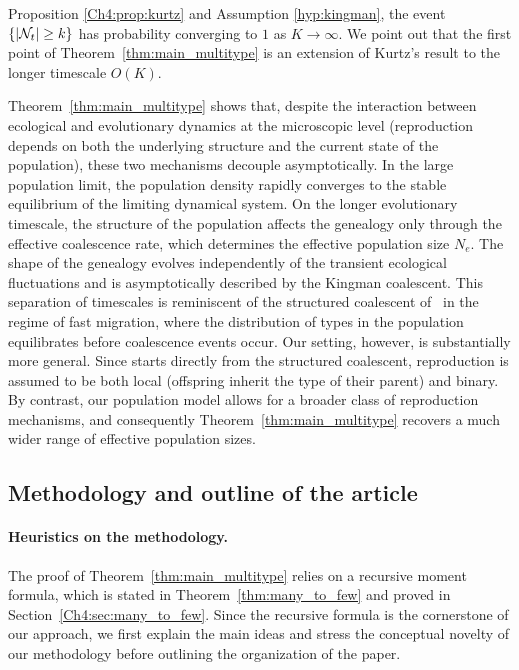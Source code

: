 \begin{refsegment}
\begin{rem}
Proposition \ref{Ch4:prop:kurtz} and Assumption \ref{hyp:kingman}, the event $\{|{\cal N}_t|\geq k\}$ has probability converging to $1$ as $K\to\infty$. 
We point out that the first point of Theorem~\ref{thm:main_multitype}
is an extension of Kurtz's result to the longer timescale $O(K)$.
\end{rem}

Theorem~\ref{thm:main_multitype} shows that, despite the interaction between ecological and evolutionary dynamics at the microscopic level (reproduction depends on both the underlying structure and the current state of the population), these two mechanisms decouple asymptotically. In the large population limit, the population density rapidly converges to the stable equilibrium of the limiting dynamical system. On the longer evolutionary timescale, the structure of the population affects the genealogy only through the effective coalescence rate, which determines the effective population size $N_e$. The shape of the genealogy evolves independently of the transient ecological fluctuations and is asymptotically described by the Kingman coalescent. This separation of timescales is reminiscent of the structured coalescent of~\cite{nordborg_separation_2002} in the regime of fast migration, where the distribution of types in the population equilibrates before coalescence events occur. Our setting, however, is substantially more general. Since \cite{nordborg_separation_2002} starts directly from the structured coalescent, reproduction is assumed to be both local (offspring inherit the type of their parent) and binary. By contrast, our population model allows for a broader class of reproduction mechanisms, and consequently Theorem~\ref{thm:main_multitype} recovers a much wider range of effective population sizes.

\subsection{Methodology and outline of the article}
\paragraph{Heuristics on the methodology.}
The proof of Theorem~\ref{thm:main_multitype} relies on a recursive moment formula, which is stated in Theorem~\ref{thm:many_to_few} and proved in Section~\ref{Ch4:sec:many_to_few}.
Since the recursive formula is the cornerstone of our approach, we first explain the main ideas and stress the conceptual novelty of our methodology before outlining the organization of the paper. 


\end{refsegment}
